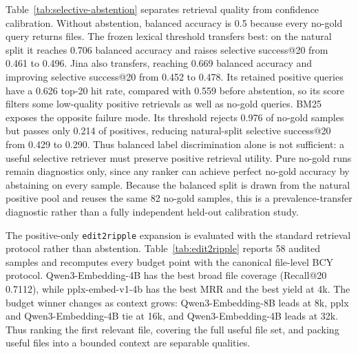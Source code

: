 \documentclass[11pt]{article}
\newcommand{\code}[1]{\texttt{#1}}
\begin{document}
Table~\ref{tab:selective-abstention} separates retrieval quality from confidence calibration. Without abstention, balanced accuracy is 0.5 because every no-gold query returns files. The frozen lexical threshold transfers best: on the natural split it reaches 0.706 balanced accuracy and raises selective success@20 from 0.461 to 0.496. Jina also transfers, reaching 0.669 balanced accuracy and improving selective success@20 from 0.452 to 0.478. Its retained positive queries have a 0.626 top-20 hit rate, compared with 0.559 before abstention, so its score filters some low-quality positive retrievals as well as no-gold queries. BM25 exposes the opposite failure mode. Its threshold rejects 0.976 of no-gold samples but passes only 0.214 of positives, reducing natural-split selective success@20 from 0.429 to 0.290. Thus balanced label discrimination alone is not sufficient: a useful selective retriever must preserve positive retrieval utility. Pure no-gold runs remain diagnostics only, since any ranker can achieve perfect no-gold accuracy by abstaining on every sample. Because the balanced split is drawn from the natural positive pool and reuses the same 82 no-gold samples, this is a prevalence-transfer diagnostic rather than a fully independent held-out calibration study.

The positive-only \code{edit2ripple} expansion is evaluated with the standard retrieval protocol rather than abstention. Table~\ref{tab:edit2ripple} reports 58 audited samples and recomputes every budget point with the canonical file-level BCY protocol. Qwen3-Embedding-4B has the best broad file coverage (Recall@20 0.7112), while pplx-embed-v1-4b has the best MRR and the best yield at 4k. The budget winner changes as context grows: Qwen3-Embedding-8B leads at 8k, pplx and Qwen3-Embedding-4B tie at 16k, and Qwen3-Embedding-4B leads at 32k. Thus ranking the first relevant file, covering the full useful file set, and packing useful files into a bounded context are separable qualities.
\end{document}
